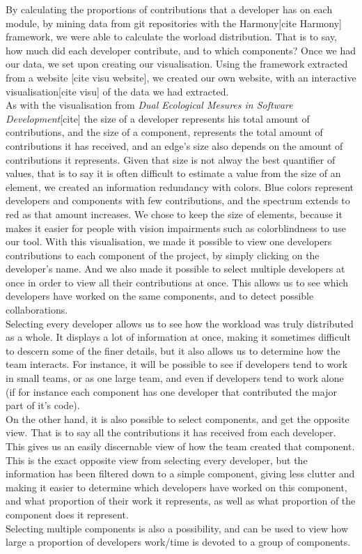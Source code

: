 By calculating the proportions of contributions that a developer has on each module, by mining data from git repositories with the Harmony[cite Harmony] framework, we were able to calculate the worload distribution. That is to say, how much did each developer contribute, and to which components?
Once we had our data, we set upon creating our visualisation. Using the framework extracted from a website [cite visu website], we created our own website, with an interactive visualisation[cite visu] of the data we had extracted.\\[0.3cm]
As with the visualisation from \emph{Dual Ecological Mesures in Software Development}[cite] the size of a developer represents his total amount of contributions, and the size of a component, represents the total amount of contributions it has received, and an edge's size also depends on the amount of contributions it represents.
Given that size is not alway the best quantifier of values, that is to say it is often difficult to estimate a value from the size of an element, we created an information redundancy with colors. Blue colors represent developers and components with few contributions, and the spectrum extends to red as that amount increases.
We chose to keep the size of elements, because it makes it easier for people with vision impairments such as colorblindness to use our tool.
With this visualisation, we made it possible to view one developers contributions to each component of the project, by simply clicking on the developer's name. And we also made it possible to select multiple developers at once in order to view all their contributions at once. This allows us to see which developers have worked on the same components, and to detect possible collaborations.\\
Selecting every developer allows us to see how the workload was truly distributed as a whole. It displays a lot of information at once, making it sometimes difficult to descern some of the finer details, but it also allows us to determine how the team interacts.
For instance, it will be possible to see if developers tend to work in small teams, or as one large team, and even if developers tend to work alone (if for instance each component has one developer that contributed the major part of it's code).\\[0.3cm]

On the other hand, it is also possible to select components, and get the opposite view. That is to say all the contributions it has received from each developer. This gives us an easily discernable view of how the team created that component.  This is the exact opposite view from selecting every developer, but the information has been filtered down to a simple component, giving less clutter and making it easier to determine which developers have worked on this component, and what proportion of their work it represents, as well as what proportion of the component does it represent.\\
Selecting multiple components is also a possibility, and can be used to view how large a proportion of developers work/time is devoted to a group of components.\\[0.3cm]

